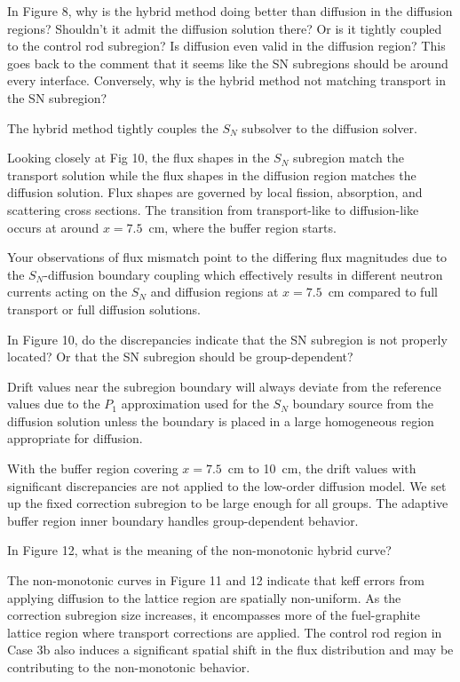\documentclass[answers,11pt]{exam}
\begin{document}
\begin{questions}
    \question In Figure 8, why is the hybrid method doing better than diffusion in the diffusion regions? Shouldn't it admit the diffusion solution there? Or is it tightly coupled to the control rod subregion? Is diffusion even valid in the diffusion region? This goes back to the comment that it seems like the SN subregions should be around every interface. Conversely, why is the hybrid method not matching transport in the SN subregion?
    \begin{solution}
        The hybrid method tightly couples the $S_N$ subsolver to the diffusion solver.

        Looking closely at Fig 10, the flux shapes in the $S_N$ subregion match the transport
        solution while the flux shapes in the diffusion region matches the diffusion solution. Flux
        shapes are governed by local fission, absorption, and scattering cross sections.
        The transition from transport-like to
        diffusion-like occurs at around $x=7.5$~cm, where the buffer region starts.

        Your observations of flux mismatch point to the differing flux magnitudes due to the
        $S_N$-diffusion boundary coupling which effectively results in different neutron currents
        acting on the $S_N$ and diffusion regions at $x=7.5$~cm compared to full
        transport or full diffusion solutions.
    \end{solution}

    \question In Figure 10, do the discrepancies indicate that the SN subregion is not properly located? Or that the SN subregion should be group-dependent?
    \begin{solution}
        Drift values near the subregion boundary will always deviate from the reference values
        due to the $P_1$ approximation used for the $S_N$ boundary source from the diffusion
        solution unless the boundary is placed in a large homogeneous region appropriate for diffusion.

        With the buffer region covering $x=7.5$~cm to 10~cm, the drift values with significant
        discrepancies are not applied to the low-order diffusion model. We set up the fixed
        correction subregion to be large enough for all groups. The adaptive buffer region inner
        boundary handles group-dependent behavior.
    \end{solution}

    \question In Figure 12, what is the meaning of the non-monotonic hybrid curve?
    \begin{solution}
        The non-monotonic curves in Figure 11 and 12 indicate that keff errors from
        applying diffusion to the lattice region are spatially non-uniform. 
        As the correction subregion size increases, it encompasses more of the fuel-graphite
        lattice region where transport corrections are applied. The control rod region in Case 3b
        also induces a significant spatial shift in the flux distribution and may be contributing
        to the non-monotonic behavior.
    \end{solution}


\end{questions}
\end{document}
